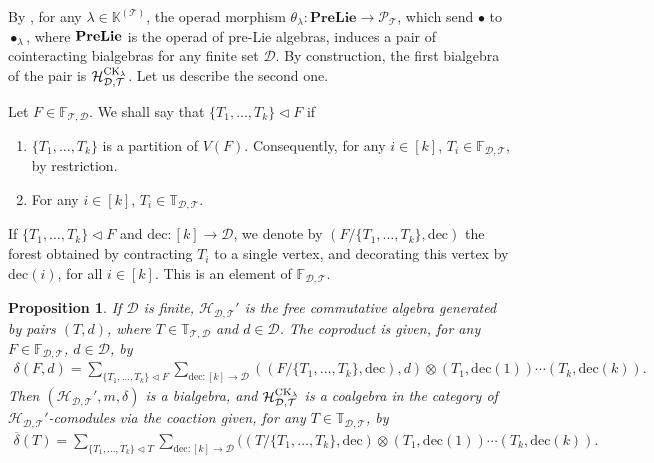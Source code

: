 \documentclass[10pt,a4paper]{amsart}
\numberwithin{equation}{section}
\newtheorem{Proposition}[Theorem]{Proposition}
 { \theoremstyle{definition}
\newtheorem{Definition}[Theorem]{Definition}
\newtheorem{Note}[Theorem]{Note}
\newtheorem{Example}[Theorem]{Example}
\newtheorem{Remark}[Theorem]{Remark}
\newtheorem{Notation}[Theorem]{Notation}}
\newcommand{\K}{\mathbb{K}}
\newcommand{\T}{\mathcal{T}}
\newcommand{\D}{\mathcal{D}}
\newcommand{\h}{\mathcal{H}}
\newcommand{\bfT}{\mathbb{T}}
\newcommand{\bfF}{\mathbb{F}}
\renewcommand{\P}{\mathcal{P}}
\newcommand{\dec}{\mathrm{dec}}
\begin{document}
By \cite{FoissyOperads}, for any $\lambda\in \K^{(\T)}$,
the operad morphism $\theta_\lambda\colon \mathbf{PreLie}\longrightarrow \P_\T$, which send $\bullet$ to $\bullet_\lambda$,
where $\bf{PreLie}$ is the operad of pre-Lie algebras,
induces a pair of cointeracting bialgebras for any finite set $\D$.
By construction, the first bialgebra of the pair is $\h_{\D,\T}^{{\rm CK}_\lambda}$. Let us describe the second one.

\begin{Definition}
Let $F\in \bfF_{\T,\D}$. We shall say that $\{T_1,\dots,T_k\}\triangleleft F$ if
\begin{enumerate}\itemsep=0pt
\item $\{T_1,\dots,T_k\}$ is a partition of $V(F)$.
Consequently, for any $i\in [k]$, $T_i\in \bfF_{\D,\T}$, by restriction.
\item For any $i\in [k]$, $T_i\in \bfT_{\D,\T}$.
\end{enumerate}
If $\{T_1,\dots,T_k\}\triangleleft F$ and $\dec\colon [k]\longrightarrow \D$, we denote by $(F/\{T_1,\dots,T_k\},\dec)$
the forest obtained by contracting $T_i$ to a single vertex,
and decorating this vertex by $\dec(i)$, for all $i\in [k]$. This is an element of $\bfF_{\D,\T}$.
\end{Definition}

\begin{Proposition}
If $\D$ is finite, $\h_{\D,\T}'$ is the free commutative algebra generated by pairs $(T,d)$,
where $T\in \bfT_{\T,\D}$ and $d\in \D$.
The coproduct is given, for any $F\in \bfF_{\D,\T}$, $d\in \D$, by
\begin{gather*}
\delta(F,d)=\sum_{\{T_1,\dots,T_k\}\triangleleft F}
\sum_{\dec\colon [k]\longrightarrow \D} ((F/\{T_1,\dots,T_k\},\dec),d)\otimes (T_1,\dec(1))\cdots (T_k,\dec(k)).
\end{gather*}
Then $(\h_{\D,\T}',m,\delta)$ is a bialgebra, and $\h_{\D,\T}^{{\rm CK}_\lambda}$ is a coalgebra
in the category of $\h_{\D,\T}'$-comodules via the coaction given, for any $T\in \bfT_{\D,\T}$, by
\begin{gather*}
\overline{\delta}(T)=\sum_{\{T_1,\dots,T_k\}\triangleleft T}
\sum_{\dec\colon [k]\longrightarrow \D} ((T/\{T_1,\dots,T_k\},\dec)\otimes (T_1,\dec(1))\cdots (T_k,\dec(k)).
\end{gather*}
\end{Proposition}
\end{document}
